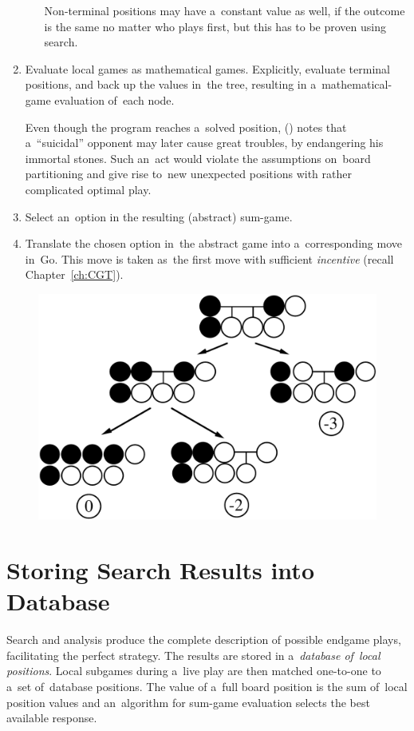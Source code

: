 \begin{enumerate}
\begin{enumerate}[(a)]
        Non-terminal positions may have a~constant value as well, if the outcome is the same no matter who plays first, but this has to be proven using search.
    \end{enumerate}

  \item Evaluate local games as mathematical games.
    Explicitly, evaluate terminal positions, and back up the values in~the tree, resulting in a~mathematical-game evaluation of~each node.

    Even though the program reaches a~solved position, (\cite{Muller1995computer}) notes that a~``suicidal'' opponent may later cause great troubles, by endangering his immortal stones.
    Such an~act would violate the assumptions on~board partitioning and give rise to~new unexpected positions with rather complicated optimal play.

  \item Select an~option in the resulting (abstract) sum-game.
  \item Translate the chosen option in~the abstract game into a~corresponding move in~Go.
    This move is taken as~the first move with sufficient \emph{incentive} (recall Chapter~\ref{ch:CGT}).
\end{enumerate}

\begin{figure}[H]
  \centering
  \includegraphics[width=.5\textwidth]{../img/Go_search_tree.png}
\end{figure}

\section{Storing Search Results into Database}

Search and analysis produce the complete description of possible endgame plays, facilitating the perfect strategy.
The results are stored in a~\emph{database of~local positions}.
Local subgames during a~live play are then matched one-to-one to a~set of~database positions.
The value of a~full board position is the sum of~local position values and an~algorithm for sum-game evaluation selects the best available response.

